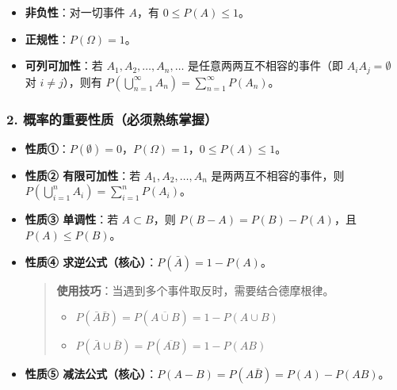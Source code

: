 \documentclass[12pt,a4paper]{ctexart}
\newenvironment{myquote}
  {\par\vspace{0.5em}\begin{quote}\sffamily\color{gray}}
  {\end{quote}\vspace{0.5em}}
\begin{document}
\begin{itemize}[noitemsep]
    \item \textbf{非负性}：对一切事件 $A$，有 $0 \le P(A) \le 1$。
    \item \textbf{正规性}：$P(\Omega) = 1$。
    \item \textbf{可列可加性}：若 $A_1, A_2, \dots, A_n, \dots$ 是任意两两互不相容的事件（即 $A_i A_j = \emptyset$ 对 $i \ne j$），则有 $P(\bigcup_{n=1}^{\infty} A_n) = \sum_{n=1}^{\infty} P(A_n)$。
\end{itemize}

\subsubsection{2. 概率的重要性质（必须熟练掌握）}

\begin{itemize}[noitemsep]
    \item \textbf{性质①}：$P(\emptyset) = 0$，$P(\Omega) = 1$，$0 \le P(A) \le 1$。

    \item \textbf{性质② 有限可加性}：若 $A_1, A_2, \dots, A_n$ 是两两互不相容的事件，则 $P(\bigcup_{i=1}^n A_i) = \sum_{i=1}^n P(A_i)$。

    \item \textbf{性质③ 单调性}：若 $A \subset B$，则 $P(B-A) = P(B) - P(A)$，且 $P(A) \le P(B)$。

    \item \textbf{性质④ 求逆公式（核心）}：$P(\bar{A}) = 1 - P(A)$。

          \begin{myquote}
              \textbf{使用技巧}：当遇到多个事件取反时，需要结合德摩根律。
              \begin{itemize}[noitemsep]
                  \item $P(\bar{A}\bar{B}) = P(\overline{A \cup B}) = 1 - P(A \cup B)$
                  \item $P(\bar{A} \cup \bar{B}) = P(\overline{AB}) = 1 - P(AB)$
              \end{itemize}
          \end{myquote}

    \item \textbf{性质⑤ 减法公式（核心）}：$P(A - B) = P(A\bar{B}) = P(A) - P(AB)$。


\end{itemize}
\end{document}
